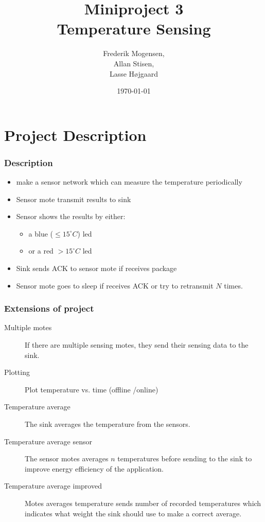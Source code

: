 \documentclass{beamer}
\title[Temperature Sensing]{Miniproject 3 \\ Temperature Sensing}
\author{Frederik Mogensen,\\
    Allan Stisen,\\
    Lasse Højgaard }
\date{\today}
\begin{document}
 \AtBeginSection[]
{
  \begin{frame}
    \tableofcontents[currentsection]
  \end{frame}
}
\begin{frame}
\titlepage
\end{frame}

\section{Project Description}


\begin{frame}
\frametitle{Description}

\begin{itemize}
	\item make a  sensor network which can measure the temperature periodically
	\item Sensor mote transmit results to sink
	\item Sensor shows the results by either:
	\begin{itemize}
		\item a blue ($\leq 15^{\circ} C $) led
		\item or a red $>15^{\circ} C$ led 
	\end{itemize}
	\item Sink sends ACK to sensor mote if receives package
	\item Sensor mote goes to sleep if receives ACK or try to retransmit $N$ times.
\end{itemize}
\end{frame}

\begin{frame}
\frametitle{Extensions of project}
\begin{description}
\item[Multiple motes] If there are multiple sensing motes, they send their sensing data to the sink.
\item[Plotting] Plot temperature vs. time (offline /online)
\item[Temperature average] The sink averages the temperature from the sensors.
\item[Temperature average sensor] The sensor motes averages $n$ temperatures before sending to the sink to improve energy efficiency of the application.
\item[Temperature average improved] Motes averages temperature sends number of recorded temperatures which indicates what weight the sink should use to make a correct average.

\end{description}
\end{frame}
\end{document}
